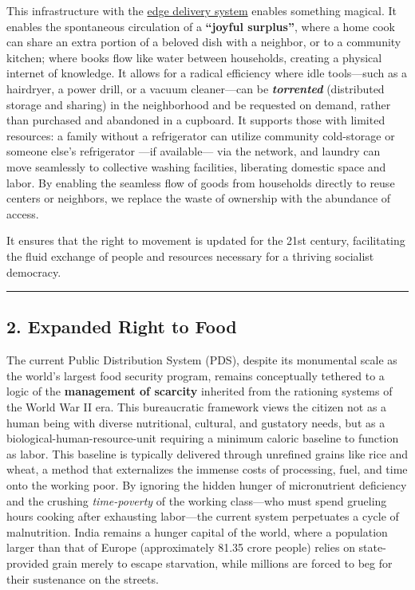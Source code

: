 This infrastructure with the
\href{Y:/extended-human-rights/cable-network/6_edge_delivery_engineering.md}{edge
delivery system} enables something magical. It enables the spontaneous
circulation of a \textbf{``joyful surplus''}, where a home cook can
share an extra portion of a beloved dish with a neighbor, or to a
community kitchen; where books flow like water between households,
creating a physical internet of knowledge. It allows for a radical
efficiency where idle tools---such as a hairdryer, a power drill, or a
vacuum cleaner---can be \textbf{\emph{torrented}} (distributed storage
and sharing) in the neighborhood and be requested on demand, rather than
purchased and abandoned in a cupboard. It supports those with limited
resources: a family without a refrigerator can utilize community
cold-storage or someone else's refrigerator ---if available--- via the
network, and laundry can move seamlessly to collective washing
facilities, liberating domestic space and labor. By enabling the
seamless flow of goods from households directly to reuse centers or
neighbors, we replace the waste of ownership with the abundance of
access.

It ensures that the right to movement is updated for the 21st century,
facilitating the fluid exchange of people and resources necessary for a
thriving socialist democracy.

\begin{center}\rule{0.5\linewidth}{0.5pt}\end{center}

\subsection{2. Expanded Right to Food}\label{expanded-right-to-food}

The current Public Distribution System (PDS), despite its monumental
scale as the world's largest food security program, remains conceptually
tethered to a logic of the \textbf{management of scarcity} inherited
from the rationing systems of the World War II era. This bureaucratic
framework views the citizen not as a human being with diverse
nutritional, cultural, and gustatory needs, but as a
biological-human-resource-unit requiring a minimum caloric baseline to
function as labor. This baseline is typically delivered through
unrefined grains like rice and wheat, a method that externalizes the
immense costs of processing, fuel, and time onto the working poor. By
ignoring the hidden hunger of micronutrient deficiency and the crushing
\emph{time-poverty} of the working class---who must spend grueling hours
cooking after exhausting labor---the current system perpetuates a cycle
of malnutrition. India remains a hunger capital of the world, where a
population larger than that of Europe (approximately 81.35 crore people)
relies on state-provided grain merely to escape starvation, while
millions are forced to beg for their sustenance on the streets.

